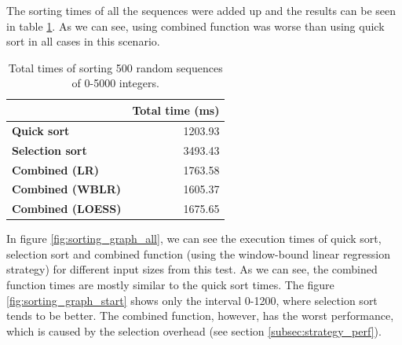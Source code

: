 The sorting times of all the sequences were added up and the results can be seen in table \ref{tab:sorting_results}. As we can see, using combined function was worse than using quick sort in all cases in this scenario.

\begin{table}[h!]
	\captionsetup{justification=centering,margin=0.5cm}
	\bgroup
	\def\arraystretch{1.5}%
	\begin{center}
	\begin{tabular}{|l|r|}
		\hline
		& \multicolumn{1}{c|}{\textbf{Total time (ms)}} \\ \hline
		\textbf{Quick sort}                  & 1203.93                                       \\ \hline
		\textbf{Selection sort}              & 3493.43                                       \\ \hline
		\textbf{Combined (LR)}               & 1763.58                                       \\ \hline
		\textbf{Combined (WBLR)}  & 1605.37                                       \\ \hline
		\textbf{Combined (LOESS)} & 1675.65                                       \\ \hline
	\end{tabular}
\end{center}
\egroup
\caption{Total times of sorting 500 random sequences of 0-5000 integers.}
\label{tab:sorting_results}
\end{table}

In figure \ref{fig:sorting_graph_all}, we can see the execution times of quick sort, selection sort and combined function (using the window-bound linear regression strategy) for different input sizes from this test. As we can see, the combined function times are mostly similar to the quick sort times. The figure \ref{fig:sorting_graph_start} shows only the interval 0-1200, where selection sort tends to be better. The combined function, however, has the worst performance, which is caused by the selection overhead (see section \ref{subsec:strategy_perf}).

